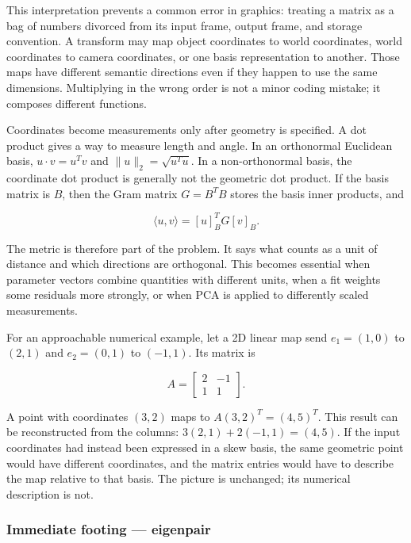 This interpretation prevents a common error in graphics: treating a matrix as a bag of numbers divorced from its input frame, output frame, and storage convention. A transform may map object coordinates to world coordinates, world coordinates to camera coordinates, or one basis representation to another. Those maps have different semantic directions even if they happen to use the same dimensions. Multiplying in the wrong order is not a minor coding mistake; it composes different functions.

Coordinates become measurements only after geometry is specified. A dot product gives a way to measure length and angle. In an orthonormal Euclidean basis, \(u\cdot v=u^Tv\) and \(\|u\|_2=\sqrt{u^Tu}\). In a non-orthonormal basis, the coordinate dot product is generally not the geometric dot product. If the basis matrix is \(B\), then the Gram matrix \(G=B^TB\) stores the basis inner products, and

\[
\langle u,v\rangle = [u]_B^T G [v]_B.
\]

The metric is therefore part of the problem. It says what counts as a unit of distance and which directions are orthogonal. This becomes essential when parameter vectors combine quantities with different units, when a fit weights some residuals more strongly, or when PCA is applied to differently scaled measurements.

For an approachable numerical example, let a 2D linear map send \(e_1=(1,0)\) to \((2,1)\) and \(e_2=(0,1)\) to \((-1,1)\). Its matrix is

\[
A=\begin{bmatrix}2&-1\\1&1\end{bmatrix}.
\]

A point with coordinates \((3,2)\) maps to \(A(3,2)^T=(4,5)^T\). This result can be reconstructed from the columns: \(3(2,1)+2(-1,1)=(4,5)\). If the input coordinates had instead been expressed in a skew basis, the same geometric point would have different coordinates, and the matrix entries would have to describe the map relative to that basis. The picture is unchanged; its numerical description is not.

\subsubsection{Immediate footing --- eigenpair}\label{01-foundations-i-ch018-immediate-footing-eigenpair}

